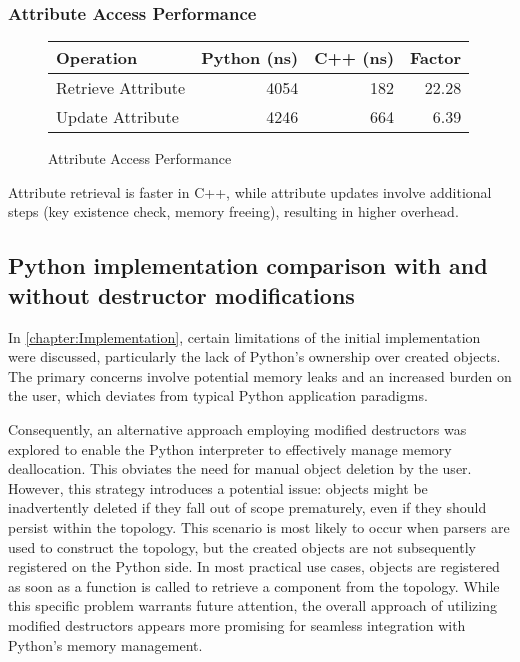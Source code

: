 \subsubsection{Attribute Access Performance}

\begin{figure}[htpb]
    \centering
\begin{tabular}{lrrr}
\textbf{Operation} & \textbf{Python (ns)} & \textbf{C++ (ns)} & \textbf{Factor} \\
\hline
Retrieve Attribute & 4054 & 182 & 22.28 \\
Update Attribute & 4246 & 664 & 6.39 \\
\end{tabular}
\label{tab:Attribute access performance}
\caption{Attribute Access Performance}
\end{figure}

Attribute retrieval is faster in C++, while attribute updates involve additional steps (key existence check, memory freeing), resulting in higher overhead.

\subsection{Python implementation comparison with and without destructor modifications}

In \autoref{chapter:Implementation}, certain limitations of the initial implementation were discussed, particularly the lack of Python's ownership over created objects. The primary concerns involve potential memory leaks and an increased burden on the user, which deviates from typical Python application paradigms.

Consequently, an alternative approach employing modified destructors was explored to enable the Python interpreter to effectively manage memory deallocation. This obviates the need for manual object deletion by the user. However, this strategy introduces a potential issue: objects might be inadvertently deleted if they fall out of scope prematurely, even if they should persist within the topology. This scenario is most likely to occur when parsers are used to construct the topology, but the created objects are not subsequently registered on the Python side. In most practical use cases, objects are registered as soon as a function is called to retrieve a component from the topology. While this specific problem warrants future attention, the overall approach of utilizing modified destructors appears more promising for seamless integration with Python's memory management.

